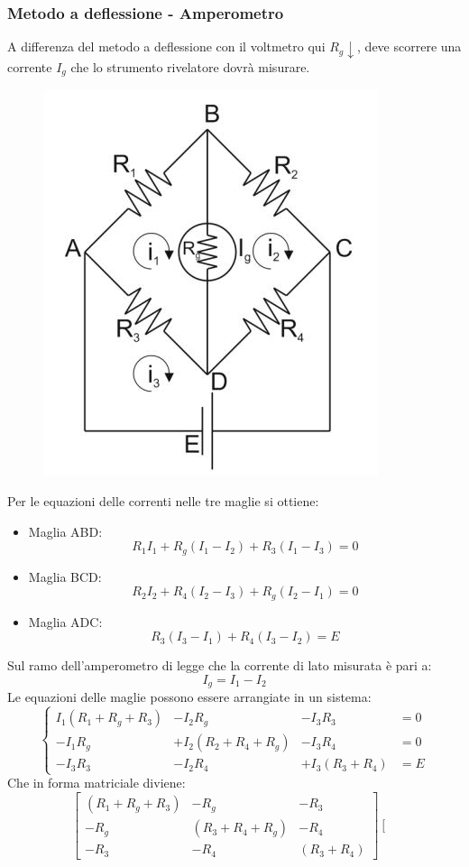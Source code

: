 \documentclass[a4paper, 15pt]{article}
\begin{document}
\subsubsection{Metodo a deflessione - Amperometro}	
\begin{adjustwidth}{2in}{}		
		A differenza del metodo a deflessione con il voltmetro qui $R_g\downarrow$, deve scorrere una corrente $I_g$ che lo strumento rivelatore dovrà misurare. 		
		\begin{figure}[H]
			\centering
			\includegraphics[width=0.3\linewidth]{fig/screenshot019}
			\label{fig:screenshot019}
		\end{figure}
		Per le equazioni delle correnti nelle tre maglie si ottiene:		
		\begin{itemize}
		\item Maglia ABD:
		\[R_1I_1 + R_g(I_1-I_2) + R_3(I_1-I_3) = 0\]
		\item Maglia BCD:
		\[R_2I_2+R_4(I_2-I_3) + R_g(I_2-I_1) = 0\]
		\item Maglia ADC:
		\[R_3(I_3-I_1) + R_4(I_3-I_2) = E\]
		\end{itemize}
		Sul ramo dell'amperometro di legge che la corrente di lato misurata è pari a:
		\[I_g = I_1 - I_2\]
		Le equazioni delle maglie possono essere arrangiate in un sistema: 		
		\[\left\{ \begin{array}{cccc}		
		I_1(R_1 + R_g + R_3) &- I_2R_g  			    &- I_3R_3       &= 0\\
		-I_1R_g  			 &+ I_2(R_2 + R_4 + R_g) &- I_3R_4       &= 0\\
		-I_3R_3  			 &- I_2R_4               &+ I_3(R_3+R_4) &= E	
		\end{array} \right.
		\]
		Che in forma matriciale diviene:
		\[\left[\begin{array}{ccc}
			(R_1+R_g+R_3) & -R_g & -R_3 \\
			-R_g & (R_3+R_4+R_g) & -R_4 \\
			-R_3 & -R_4 & (R_3+R_4)
		\end{array}\right]\left[\begin{array}{c}

\end{array}\]
\end{adjustwidth}
\end{document}
